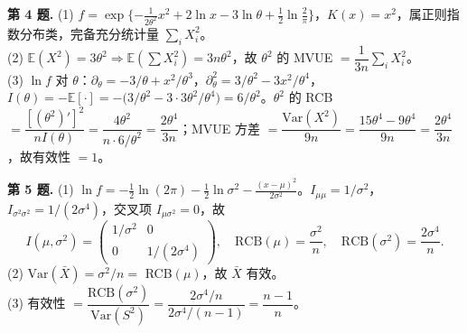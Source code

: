 \documentclass[12pt,a4paper]{ctexart}
\newcommand{\E}{\mathbb{E}}
\newcommand{\Var}{\mathrm{Var}}
\begin{document}
\smallskip
\noindent\textbf{第 4 题.}\;
(1) $f=\exp\{-\tfrac1{2\theta^2}x^2+2\ln x-3\ln\theta+\tfrac12\ln\tfrac2\pi\}$，$K(x)=x^2$，属正则指数分布类，完备充分统计量 $\sum_i X_i^2$。\\
(2) $\E(X^2)=3\theta^2\Rightarrow\E(\sum X_i^2)=3n\theta^2$，故 $\theta^2$ 的 MVUE $=\boxed{\dfrac1{3n}\sum_i X_i^2}$。\\
(3) $\ln f$ 对 $\theta$：$\partial_\theta=-3/\theta+x^2/\theta^3$，$\partial^2_\theta=3/\theta^2-3x^2/\theta^4$，$I(\theta)=-\E[\cdot]=-\big(3/\theta^2-3\cdot3\theta^2/\theta^4\big)=6/\theta^2$。$\theta^2$ 的 RCB $=\dfrac{[(\theta^2)']^2}{nI(\theta)}=\dfrac{4\theta^2}{n\cdot 6/\theta^2}=\dfrac{2\theta^4}{3n}$；MVUE 方差 $=\dfrac{\Var(X^2)}{9n}=\dfrac{15\theta^4-9\theta^4}{9n}=\dfrac{2\theta^4}{3n}$，故有效性 $=1$。

\smallskip
\noindent\textbf{第 5 题.}\;
(1) $\ln f=-\tfrac12\ln(2\pi)-\tfrac12\ln\sigma^2-\tfrac{(x-\mu)^2}{2\sigma^2}$。$I_{\mu\mu}=1/\sigma^2$，$I_{\sigma^2\sigma^2}=1/(2\sigma^4)$，交叉项 $I_{\mu\sigma^2}=0$，故
\[
I(\mu,\sigma^2)=\begin{pmatrix}1/\sigma^2 & 0\\ 0 & 1/(2\sigma^4)\end{pmatrix},\quad
\text{RCB}(\mu)=\frac{\sigma^2}{n},\quad \text{RCB}(\sigma^2)=\frac{2\sigma^4}{n}.
\]
(2) $\Var(\bar X)=\sigma^2/n=$ RCB$(\mu)$，故 $\bar X$ 有效。\\
(3) 有效性 $=\dfrac{\text{RCB}(\sigma^2)}{\Var(S^2)}=\dfrac{2\sigma^4/n}{2\sigma^4/(n-1)}=\dfrac{n-1}{n}$。
\end{document}
